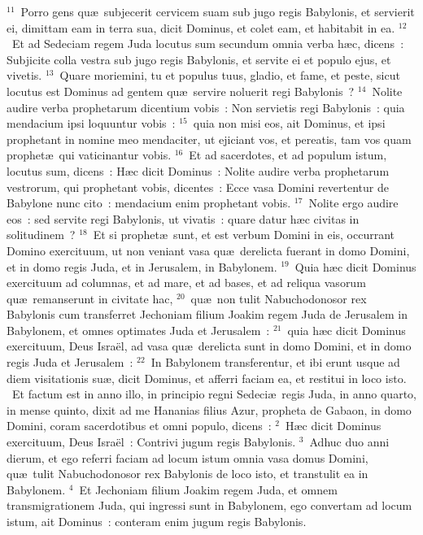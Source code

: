 ${}^{11}$~Porro gens qu\ae\ subjecerit cervicem suam sub jugo regis Babylonis, et servierit ei, dimittam eam in terra sua, dicit Dominus, et colet eam, et habitabit in ea.
${}^{12}$~Et ad Sedeciam regem Juda locutus sum secundum omnia verba h\ae c, dicens~: Subjicite colla vestra sub jugo regis Babylonis, et servite ei et populo ejus, et vivetis.
${}^{13}$~Quare moriemini, tu et populus tuus, gladio, et fame, et peste, sicut locutus est Dominus ad gentem qu\ae\ servire noluerit regi Babylonis~?
${}^{14}$~Nolite audire verba prophetarum dicentium vobis~: Non servietis regi Babylonis~: quia mendacium ipsi loquuntur vobis~:
${}^{15}$~quia non misi eos, ait Dominus, et ipsi prophetant in nomine meo mendaciter, ut ejiciant vos, et pereatis, tam vos quam prophet\ae\ qui vaticinantur vobis.
${}^{16}$~Et ad sacerdotes, et ad populum istum, locutus sum, dicens~: H\ae c dicit Dominus~: Nolite audire verba prophetarum vestrorum, qui prophetant vobis, dicentes~: Ecce vasa Domini revertentur de Babylone nunc cito~: mendacium enim prophetant vobis.
${}^{17}$~Nolite ergo audire eos~: sed servite regi Babylonis, ut vivatis~: quare datur h\ae c civitas in solitudinem~?
${}^{18}$~Et si prophet\ae\ sunt, et est verbum Domini in eis, occurrant Domino exercituum, ut non veniant vasa qu\ae\ derelicta fuerant in domo Domini, et in domo regis Juda, et in Jerusalem, in Babylonem.
${}^{19}$~Quia h\ae c dicit Dominus exercituum ad columnas, et ad mare, et ad bases, et ad reliqua vasorum qu\ae\ remanserunt in civitate hac,
${}^{20}$~qu\ae\ non tulit Nabuchodonosor rex Babylonis cum transferret Jechoniam filium Joakim regem Juda de Jerusalem in Babylonem, et omnes optimates Juda et Jerusalem~:
${}^{21}$~quia h\ae c dicit Dominus exercituum, Deus Isra\"el, ad vasa qu\ae\ derelicta sunt in domo Domini, et in domo regis Juda et Jerusalem~:
${}^{22}$~In Babylonem transferentur, et ibi erunt usque ad diem visitationis su\ae , dicit Dominus, et afferri faciam ea, et restitui in loco isto.
~Et factum est in anno illo, in principio regni Sedeci\ae\ regis Juda, in anno quarto, in mense quinto, dixit ad me Hananias filius Azur, propheta de Gabaon, in domo Domini, coram sacerdotibus et omni populo, dicens~:
${}^{2}$~H\ae c dicit Dominus exercituum, Deus Isra\"el~: Contrivi jugum regis Babylonis.
${}^{3}$~Adhuc duo anni dierum, et ego referri faciam ad locum istum omnia vasa domus Domini, qu\ae\ tulit Nabuchodonosor rex Babylonis de loco isto, et transtulit ea in Babylonem.
${}^{4}$~Et Jechoniam filium Joakim regem Juda, et omnem transmigrationem Juda, qui ingressi sunt in Babylonem, ego convertam ad locum istum, ait Dominus~: conteram enim jugum regis Babylonis.
